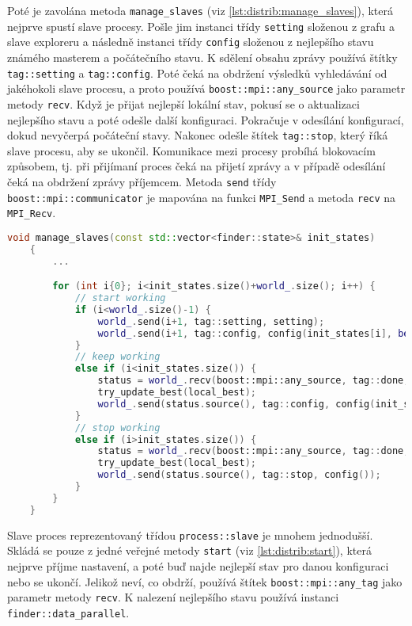 Poté je zavolána metoda \texttt{manage\_slaves} (viz \ref{lst:distrib:manage_slaves}), která nejprve spustí slave procesy.
Pošle jim instanci třídy \texttt{setting} složenou z grafu a slave exploreru a následně instanci třídy \texttt{config} složenou z nejlepšího stavu známého masterem a počátečního stavu.
K sdělení obsahu zprávy používá štítky \texttt{tag::setting} a \texttt{tag::config}.
Poté čeká na obdržení výsledků vyhledávání od jakéhokoli slave procesu, a proto používá \texttt{boost::mpi::any\_source} jako parametr metody \texttt{recv}.
Když je přijat nejlepší lokální stav, pokusí se o aktualizaci nejlepšího stavu a poté odešle další konfiguraci.
Pokračuje v odesílání konfigurací, dokud nevyčerpá počáteční stavy.
Nakonec odešle štítek \texttt{tag::stop}, který říká slave procesu, aby se ukončil.
Komunikace mezi procesy probíhá blokovacím způsobem, tj. při přijímaní proces čeká na přijetí zprávy a v případě odesílání čeká na obdržení zprávy příjemcem.
Metoda \texttt{send} třídy \texttt{boost::mpi::communicator} je mapována na funkci \texttt{MPI\_Send} a metoda \texttt{recv} na \texttt{MPI\_Recv}.

\begin{lstlisting}[language=C++, label={lst:distrib:manage_slaves}, title={Metoda pro obstarání slave procesů}]
    void manage_slaves(const std::vector<finder::state>& init_states)
    {
        ...

        for (int i{0}; i<init_states.size()+world_.size(); i++) {
            // start working
            if (i<world_.size()-1) {
                world_.send(i+1, tag::setting, setting);
                world_.send(i+1, tag::config, config(init_states[i], best_));
            }
            // keep working
            else if (i<init_states.size()) {
                status = world_.recv(boost::mpi::any_source, tag::done, local_best);
                try_update_best(local_best);
                world_.send(status.source(), tag::config, config(init_states[i], best_));
            }
            // stop working
            else if (i>init_states.size()) {
                status = world_.recv(boost::mpi::any_source, tag::done, local_best);
                try_update_best(local_best);
                world_.send(status.source(), tag::stop, config());
            }
        }
    }
\end{lstlisting}

Slave proces reprezentovaný třídou \texttt{process::slave} je mnohem jednodušší.
Skládá se pouze z jedné veřejné metody \texttt{start} (viz \ref{lst:distrib:start}), která nejprve příjme nastavení, a poté buď najde nejlepší stav pro danou konfiguraci nebo se ukončí.
Jelikož neví, co obdrží, používá štítek \texttt{boost::mpi::any\_tag} jako parametr metody \texttt{recv}.
K nalezení nejlepšího stavu používá instanci \texttt{finder::data\_parallel}.

